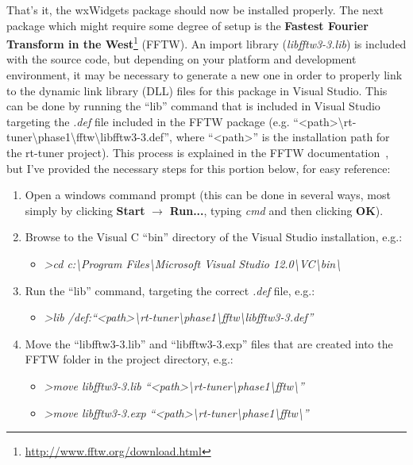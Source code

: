\documentclass[12pt]{report}
\begin{document}
\indent That's it, the wxWidgets package should now be installed properly. The next package which might require some degree of setup is the {\bf Fastest Fourier Transform in the West}\footnote{\url{http://www.fftw.org/download.html}} (FFTW). An import library (\emph{libfftw3-3.lib}) is included with the source code, but depending on your platform and development environment, it may be necessary to generate a new one in order to properly link to the dynamic link library (DLL) files for this package in Visual Studio. This can be done by running the ``lib'' command that is included in Visual Studio targeting the \emph{.def} file included in the FFTW package (e.g. ``\textless path\textgreater\textbackslash rt-tuner\textbackslash phase1\textbackslash fftw\textbackslash libfftw3-3.def'', where ``\textless path\textgreater'' is the installation path for the rt-tuner project). This process is explained in the FFTW documentation~\cite{Frigo-nd}, but I've provided the necessary steps for this portion below, for easy reference:

\begin{enumerate}
	\item Open a windows command prompt (this can be done in several ways, most simply by clicking {\bf Start} $\rightarrow$ {\bf Run...}, typing \emph{cmd} and then clicking {\bf OK}).
	\item Browse to the Visual C ``bin'' directory of the Visual Studio installation, e.g.:
		\begin{itemize} \item \emph{\textgreater cd c:\textbackslash Program Files\textbackslash Microsoft Visual Studio 12.0\textbackslash VC\textbackslash bin\textbackslash} \end{itemize}
	\item Run the ``lib'' command, targeting the correct \emph{.def} file, e.g.:
		\begin{itemize} \item \emph{\textgreater lib /def:``\textless path\textgreater\textbackslash rt-tuner\textbackslash phase1\textbackslash fftw\textbackslash libfftw3-3.def''} \end{itemize}
	\item Move the ``libfftw3-3.lib'' and ``libfftw3-3.exp'' files that are created into the FFTW folder in the project directory, e.g.: 
		\begin{itemize}
			\item \emph{\textgreater move libfftw3-3.lib ``\textless path\textgreater\textbackslash rt-tuner\textbackslash phase1\textbackslash fftw\textbackslash''}
			\item \emph{\textgreater move libfftw3-3.exp ``\textless path\textgreater\textbackslash rt-tuner\textbackslash phase1\textbackslash fftw\textbackslash''}
		\end{itemize}
\end{enumerate}
\end{document}

